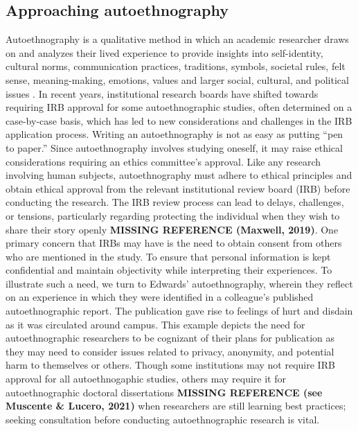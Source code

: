 \documentclass[
  11pt,
]{book}
\begin{document}
\subsection{Approaching autoethnography}\label{approaching-autoethnography}

Autoethnography is a qualitative method in which an academic researcher draws on and analyzes their lived experience to provide insights into self-identity, cultural norms, communication practices, traditions, symbols, societal rules, felt sense, meaning-making, emotions, values and larger social, cultural, and political issues \citep[p.~2]{adams_chapter_2014}. In recent years, institutional research boards have shifted towards requiring IRB approval for some autoethnographic studies, often determined on a case-by-case basis, which has led to new considerations and challenges in the IRB application process. Writing an autoethnography is not as easy as putting ``pen to paper.'' Since autoethnography involves studying oneself, it may raise ethical considerations requiring an ethics committee's approval. Like any research involving human subjects, autoethnography must adhere to ethical principles and obtain ethical approval from the relevant institutional review board (IRB) before conducting the research. The IRB review process can lead to delays, challenges, or tensions, particularly regarding protecting the individual when they wish to share their story openly \textbf{MISSING REFERENCE (Maxwell, 2019)}. One primary concern that IRBs may have is the need to obtain consent from others who are mentioned in the study. To ensure that personal information is kept confidential and maintain objectivity while interpreting their experiences. To illustrate such a need, we turn to Edwards' \citeyearpar{edwards_ethical_2021} autoethnography, wherein they reflect on an experience in which they were identified in a colleague's published autoethnographic report. The publication gave rise to feelings of hurt and disdain as it was circulated around campus. This example depicts the need for autoethnographic researchers to be cognizant of their plans for publication as they may need to consider issues related to privacy, anonymity, and potential harm to themselves or others. Though some institutions may not require IRB approval for all autoethnogaphic studies, others may require it for autoethnographic doctoral dissertations \textbf{MISSING REFERENCE (see Muscente \& Lucero, 2021)} when researchers are still learning best practices; seeking consultation before conducting autoethnographic research is vital.
\end{document}
